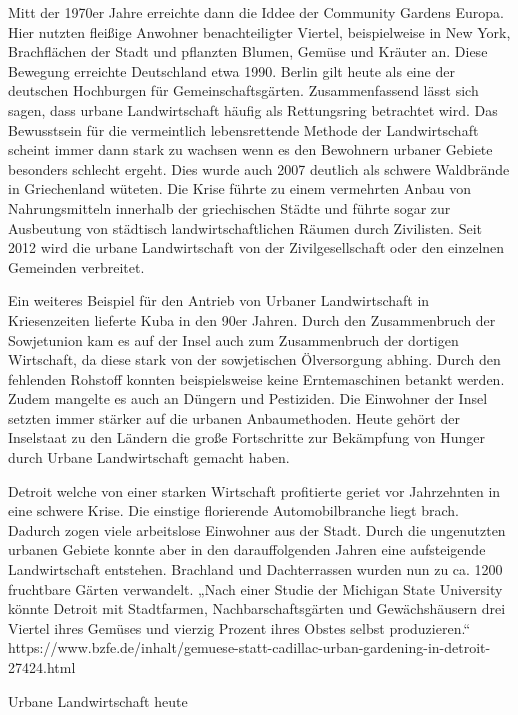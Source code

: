 \documentclass{article}
\begin{document}
Mitt der 1970er Jahre erreichte dann die Iddee der Community Gardens Europa. Hier nutzten fleißige Anwohner benachteiligter Viertel, beispielweise in New York, Brachflächen der Stadt und pflanzten Blumen, Gemüse und Kräuter an. Diese Bewegung erreichte Deutschland etwa 1990. Berlin gilt heute als eine der deutschen Hochburgen für Gemeinschaftsgärten. Zusammenfassend lässt sich sagen, dass urbane Landwirtschaft häufig als Rettungsring betrachtet wird. Das Bewusstsein für die vermeintlich lebensrettende Methode der Landwirtschaft scheint immer dann stark zu wachsen wenn es den Bewohnern urbaner Gebiete besonders schlecht ergeht. Dies wurde auch 2007 deutlich als schwere Waldbrände in Griechenland wüteten. Die Krise führte zu einem vermehrten Anbau von Nahrungsmitteln innerhalb der griechischen Städte und führte sogar zur Ausbeutung von städtisch landwirtschaftlichen Räumen durch Zivilisten. Seit 2012 wird die urbane Landwirtschaft von der Zivilgesellschaft oder den einzelnen Gemeinden verbreitet.

Ein weiteres Beispiel für den Antrieb von Urbaner Landwirtschaft in Kriesenzeiten lieferte Kuba in den 90er Jahren. Durch den Zusammenbruch der Sowjetunion kam es auf der Insel auch zum Zusammenbruch der dortigen Wirtschaft, da diese stark von der sowjetischen Ölversorgung abhing. Durch den fehlenden Rohstoff konnten beispielsweise keine Erntemaschinen betankt werden. Zudem mangelte es auch an Düngern und Pestiziden. Die Einwohner der Insel setzten immer stärker auf die urbanen Anbaumethoden. Heute gehört der Inselstaat zu den Ländern die große Fortschritte zur Bekämpfung von Hunger durch Urbane Landwirtschaft gemacht haben.

Detroit welche von einer starken Wirtschaft profitierte geriet vor Jahrzehnten in eine schwere Krise. Die einstige florierende Automobilbranche liegt brach. Dadurch zogen viele arbeitslose Einwohner aus der Stadt. Durch die ungenutzten urbanen Gebiete konnte aber in den darauffolgenden Jahren eine aufsteigende Landwirtschaft entstehen. Brachland und Dachterrassen wurden nun zu ca. 1200 fruchtbare Gärten verwandelt. „Nach einer Studie der Michigan State University könnte Detroit mit Stadtfarmen, Nachbarschaftsgärten und Gewächshäusern drei Viertel ihres Gemüses und vierzig Prozent ihres Obstes selbst produzieren.“ https://www.bzfe.de/inhalt/gemuese-statt-cadillac-urban-gardening-in-detroit-27424.html

Urbane Landwirtschaft heute
\end{document}

